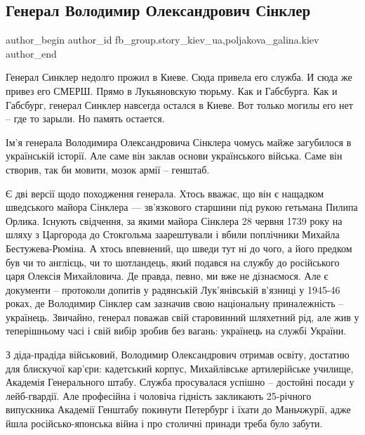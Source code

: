  
 
 
 
 
 
\subsection{Генерал Володимир Олександрович Сінклер}
\label{sec:23_12_2021.fb.fb_group.story_kiev_ua.2.general_sinkler}
 
\ifcmt
 author_begin
   author_id fb_group.story_kiev_ua,poljakova_galina.kiev
 author_end
\fi

Генерал Синклер недолго прожил в Киеве. Сюда привела его служба. И сюда же
привез его СМЕРШ. Прямо в Лукьяновскую тюрьму. Как и Габсбурга. Как и Габсбург,
генерал Синклер навсегда остался в Киеве. Вот только могилы его нет – где то
зарыли. Но память остается. 

Ім’я генерала Володимира Олександровича Сінклера чомусь майже загубилося в
українській історії. Але саме він заклав основи українського війська. Саме він
створив, так би мовити, мозок армії – генштаб. 

Є дві версії щодо походження генерала. Хтось вважає, що він є нащадком
шведського майора Сінклера — зв'язкового старшини під рукою гетьмана Пилипа
Орлика. Існують свідчення, за якими майора Сінклера 28 червня 1739 року на
шляху з Царгорода до Стокгольма заарештували і вбили поплічники Михайла
Бестужева-Рюміна. А хтось впевнений, що шведи тут ні до чого, а його предком
був чи то англієць, чи то шотландець, який подався на службу до російського
царя Олексія Михайловича. Де правда, певно, ми вже не дізнаємося. Але є
документи – протоколи допитів у радянській Лук’янівській в’язниці у 1945-46
роках, де Володимир Сінклер сам зазначив свою національну приналежність –
українець. Звичайно, генерал поважав свій старовинний шляхетний рід, але жив у
теперішньому часі і свій вибір зробив без вагань: українець на службі України.

З діда-прадіда військовий, Володимир Олександрович отримав освіту, достатню для
блискучої кар’єри: кадетський корпус, Михайлівське артилерійське училище,
Академія Генерального штабу. Служба просувалася успішно – достойні посади у
лейб-гвардії. Але професійна і чоловіча гідність закликають 25-річного
випускника Академії Генштабу покинути Петербург і їхати до Маньчжурії, адже
йшла російсько-японська війна і про столичні принади треба було забути.

